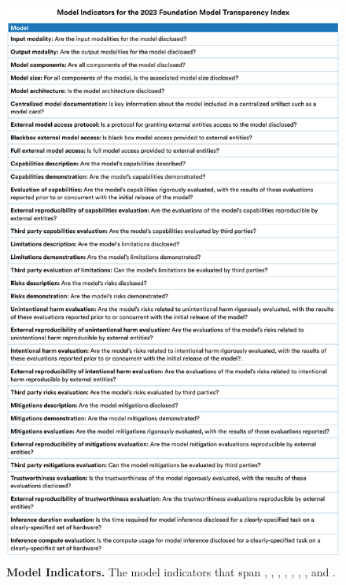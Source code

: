 \begin{figure}
\centering
\includegraphics[keepaspectratio, height=\textheight, width=\textwidth]{figures/indicators_list_model-1.pdf}
\caption{\textbf{Model Indicators.} 
The \nummodelindicators model indicators that span \modelbasics, \modelaccess, \capabilities, \limitations, \risks, \modelmitigations, \trustworthiness, and \inference.}
\label{fig:model-indicators}
\end{figure}

